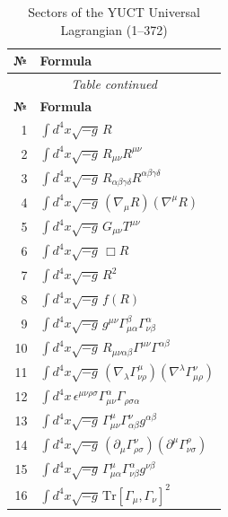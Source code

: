 \documentclass[12pt,a4paper]{article}
\begin{document}
	\scriptsize
\begin{longtable}{r p{}}
	\caption{Sectors of the YUCT Universal Lagrangian (1–372)}\label{tab:sectors-372}\\
	\toprule
	\textbf{№} & \textbf{Formula} \\
	\midrule
	\endfirsthead
	\multicolumn{2}{c}{\textit{Table continued}}\\
	\toprule
	\textbf{№} & \textbf{Formula} \\
	\midrule
	\endhead
	\bottomrule
	\endfoot
	1 & \(\displaystyle \int d^4x\sqrt{-g}\,R\) \\
	2 & \(\displaystyle \int d^4x\sqrt{-g}\,R_{\mu\nu}R^{\mu\nu}\) \\
	3 & \(\displaystyle \int d^4x\sqrt{-g}\,R_{\alpha\beta\gamma\delta}R^{\alpha\beta\gamma\delta}\) \\
	4 & \(\displaystyle \int d^4x\sqrt{-g}\,(\nabla_\mu R)(\nabla^\mu R)\) \\
	5 & \(\displaystyle \int d^4x\sqrt{-g}\,G_{\mu\nu}T^{\mu\nu}\) \\
	6 & \(\displaystyle \int d^4x\sqrt{-g}\,\Box R\) \\
	7 & \(\displaystyle \int d^4x\sqrt{-g}\,R^2\) \\
	8 & \(\displaystyle \int d^4x\sqrt{-g}\,f(R)\) \\
	9 & \(\displaystyle \int d^4x\sqrt{-g}\,g^{\mu\nu}\Gamma^{\beta}_{\mu\alpha}\Gamma^{\alpha}_{\nu\beta}\) \\
	10 & \(\displaystyle \int d^4x\sqrt{-g}\,R_{\mu\nu\alpha\beta}\Gamma^{\mu\nu}\Gamma^{\alpha\beta}\) \\
	11 & \(\displaystyle \int d^4x\sqrt{-g}\,(\nabla_\lambda\Gamma^{\mu}_{\nu\rho})(\nabla^\lambda\Gamma^{\nu}_{\mu\rho})\) \\
	12 & \(\displaystyle \int d^4x\,\epsilon^{\mu\nu\rho\sigma}\Gamma^{\alpha}_{\mu\nu}\Gamma_{\rho\sigma\alpha}\) \\
	13 & \(\displaystyle \int d^4x\sqrt{-g}\,\Gamma^{\mu}_{\mu\nu}\Gamma^{\nu}_{\alpha\beta}g^{\alpha\beta}\) \\
	14 & \(\displaystyle \int d^4x\sqrt{-g}\,(\partial_\mu\Gamma^{\nu}_{\rho\sigma})(\partial^\mu\Gamma^{\rho}_{\nu\sigma})\) \\
	15 & \(\displaystyle \int d^4x\sqrt{-g}\,\Gamma^{\mu}_{\mu\alpha}\Gamma^{\alpha}_{\nu\beta}g^{\nu\beta}\) \\
	16 & \(\displaystyle \int d^4x\sqrt{-g}\,\mathrm{Tr}[\Gamma_\mu,\Gamma_\nu]^2\) \\

\end{longtable}
\end{document}
